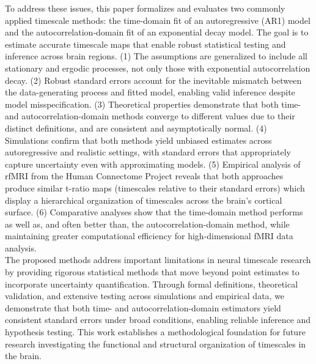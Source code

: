 \documentclass[latex/main.tex]{subfiles}
\begin{document}
To address these issues, this paper formalizes and evaluates two commonly applied timescale methods: the time-domain fit of an autoregressive (AR1) model and the autocorrelation-domain fit of an exponential decay model. The goal is to estimate accurate timescale maps that enable robust statistical testing and inference across brain regions. (1) The assumptions are generalized to include all stationary and ergodic processes, not only those with exponential autocorrelation decay. (2) Robust standard errors account for the inevitable mismatch between the data-generating process and fitted model, enabling valid inference despite model misspecification. (3) Theoretical properties demonstrate that both time- and autocorrelation-domain methods converge to different values due to their distinct definitions, and are consistent and asymptotically normal. (4) Simulations confirm that both methods yield unbiased estimates across autoregressive and realistic settings, with standard errors that appropriately capture uncertainty even with approximating models. (5) Empirical analysis of rfMRI from the Human Connectome Project reveals that both approaches produce similar t-ratio maps (timescales relative to their standard errors) which display a hierarchical organization of timescales across the brain's cortical surface. (6) Comparative analyses show that the time-domain method performs as well as, and often better than, the autocorrelation-domain method, while maintaining greater computational efficiency for high-dimensional fMRI data analysis.\\

The proposed methods address important limitations in neural timescale research by providing rigorous statistical methods that move beyond point estimates to incorporate uncertainty quantification. Through formal definitions, theoretical validation, and extensive testing across simulations and empirical data, we demonstrate that both time- and autocorrelation-domain estimators yield consistent standard errors under broad conditions, enabling reliable inference and hypothesis testing. This work establishes a methodological foundation for future research investigating the functional and structural organization of timescales in the brain.
\end{document}

